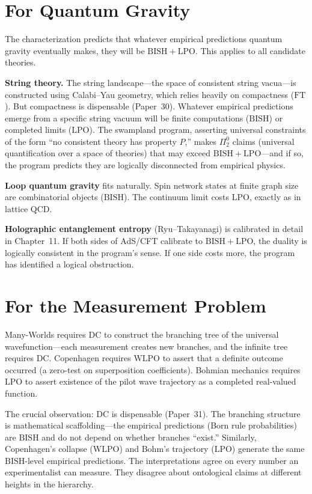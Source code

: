 \documentclass[11pt,a4paper]{report}
\theoremstyle{plain}
\theoremstyle{definition}
\theoremstyle{remark}
\newcommand{\BISH}{\mathrm{BISH}}
\newcommand{\WLPO}{\mathrm{WLPO}}
\newcommand{\LPO}{\mathrm{LPO}}
\newcommand{\FT}{\mathrm{FT}}
\newcommand{\DC}{\mathrm{DC}}
\begin{document}
\section{For Quantum Gravity}

The characterization predicts that whatever empirical predictions quantum gravity eventually makes, they will be $\BISH+\LPO$. This applies to all candidate theories.

\textbf{String theory.} The string landscape---the space of consistent string vacua---is constructed using Calabi--Yau geometry, which relies heavily on compactness ($\FT$). But compactness is dispensable (Paper~30). Whatever empirical predictions emerge from a specific string vacuum will be finite computations ($\BISH$) or completed limits ($\LPO$). The swampland program, asserting universal constraints of the form ``no consistent theory has property $P$,'' makes $\Pi^0_2$ claims (universal quantification over a space of theories) that may exceed $\BISH+\LPO$---and if so, the program predicts they are logically disconnected from empirical physics.

\textbf{Loop quantum gravity} fits naturally. Spin network states at finite graph size are combinatorial objects ($\BISH$). The continuum limit costs $\LPO$, exactly as in lattice QCD.

\textbf{Holographic entanglement entropy} (Ryu--Takayanagi) is calibrated in detail in Chapter~11. If both sides of AdS/CFT calibrate to $\BISH+\LPO$, the duality is logically consistent in the program's sense. If one side costs more, the program has identified a logical obstruction.

\section{For the Measurement Problem}

Many-Worlds requires $\DC$ to construct the branching tree of the universal wavefunction---each measurement creates new branches, and the infinite tree requires $\DC$. Copenhagen requires $\WLPO$ to assert that a definite outcome occurred (a zero-test on superposition coefficients). Bohmian mechanics requires $\LPO$ to assert existence of the pilot wave trajectory as a completed real-valued function.

The crucial observation: $\DC$ is dispensable (Paper~31). The branching structure is mathematical scaffolding---the empirical predictions (Born rule probabilities) are $\BISH$ and do not depend on whether branches ``exist.'' Similarly, Copenhagen's collapse ($\WLPO$) and Bohm's trajectory ($\LPO$) generate the same $\BISH$-level empirical predictions. The interpretations agree on every number an experimentalist can measure. They disagree about ontological claims at different heights in the hierarchy.
\end{document}
